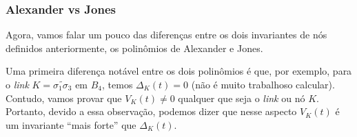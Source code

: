 	\subsubsection{Alexander vs Jones}
	Agora, vamos falar um pouco das diferenças entre os dois invariantes de nós definidos 
	anteriormente, os polinômios de Alexander e Jones.
	
	\par\vspace{0.3cm} Uma primeira diferença notável entre os dois polinômios é que, por exemplo, 
	para o \textit{link} $K = \widetilde{\sigma_1\sigma_3}$ em $B_4$, temos $\Delta_K(t) = 0$ 
	(não é muito trabalhoso calcular). Contudo, vamos provar que $V_K(t)\neq 0$ qualquer 
	que seja o \textit{link} ou nó $K$. Portanto, devido a essa observação, podemos dizer 
	que nesse aspecto $V_K(t)$ é um invariante ``mais forte'' que $\Delta_K(t)$.
	
